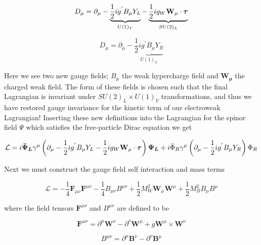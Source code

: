 \begin{equation} \label{eq:qed:left} 
D_\mu = \partial_{\mu}
- \underbrace{\frac{1}{2}ig^{'}B_{\mu}Y_{L}}_{U(1)_Y} -
  \underbrace{\frac{1}{2}ig_{W}\bf{W}_\mu \cdot \boldsymbol{\tau}}_{SU(2)_L}
\end{equation}

\begin{equation} \label{eq:qed:right} 
D_\mu = \partial_{\mu}  - \underbrace{\frac{1}{2}ig^{'}B_{\mu}Y_{R}}_{U(1)_Y} 
\end{equation}

Here we see two new gauge fields; $B_\mu$ the weak hypercharge field and
$\boldsymbol{W_\mu}$ the charged weak field.  The form of these fields is chosen
such that the final Lagrangian is invariant under $SU(2)_L \times U(1)_Y$
transformations, and thus we have restored gauge invariance for the kinetic term
of our electroweak Lagrangian!  Inserting these new definitions into the
Lagrangian for the spinor field $\Psi$ which satisfies the free-particle Dirac
equation we get

\begin{equation} \label{eq:qed:fermion_lagrangian}
\mathcal{L} = i\boldsymbol{\bar{\Psi}_L}\gamma^{\mu} \left( \partial_{\mu}
- \frac{1}{2}ig^{'}B_{\mu}Y_{L} - \frac{1}{2}ig_{W}\bf{W}_\mu \cdot
  \boldsymbol{\tau} \right) \boldsymbol{\Psi_L} + i \bar{\Phi}_{R}\gamma^{\mu}
\left(\partial_{\mu} - \frac{1}{2}ig^{'}B_{\mu}Y_{R} \right) \Phi_{R}
\end{equation}

Next we must construct the gauge field self interaction and mass terms

\begin{equation} \label{eq:qed:gauge_lagrangian}
\mathcal{L} = -\frac{1}{4}\boldsymbol{F}_{\mu\nu}\boldsymbol{F}^{\mu\nu}
-\frac{1}{4}B_{\mu\nu}B^{\mu\nu} +
\frac{1}{2}M_{W}^{2}\boldsymbol{W}_{\mu}\boldsymbol{W}^{\mu} +
\frac{1}{2}M_{B}^{2}B_{\mu}B^{\mu}
\end{equation}

where the field tensors $\boldsymbol{F}^{\mu\nu}$ and $B^{\mu\nu}$ are defined
to be

\begin{equation}
\boldsymbol{F}^{\mu\nu}  = \partial^{\mu}\boldsymbol{W}^{\nu} -
\partial^{\nu}\boldsymbol{W}^{\mu} + g\boldsymbol{W}^{\mu} \times
\boldsymbol{W}^{\nu}
\end{equation}

\begin{equation}
B^{\mu\nu} =  \partial^{\mu}\boldsymbol{B}^{\nu} -
\partial^{\nu}\boldsymbol{B}^{\mu}
\end{equation}

